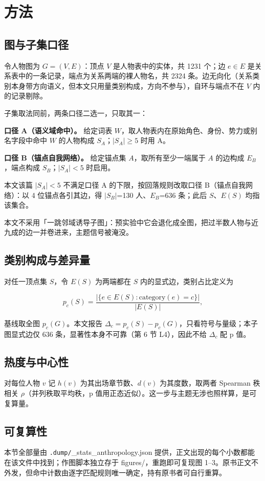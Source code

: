 \section{方法}

\subsection{图与子集口径}

令人物图为 $G=(V,E)$：顶点 $V$ 是人物表中的实体，共 1231 个；边 $e\in E$ 是关系表中的一条记录，端点为关系两端的裸人物名，共 2324 条。边无向化（关系类别本身带方向语义，但本文只用量类别构成，方向不参与），自环与端点不在 $V$ 内的记录剔除。

子集取法同前，两条口径二选一，只取其一：

\textbf{口径 A（语义域命中）。} 给定词表 $W$，取人物表内在原始角色、身份、势力或别名字段中命中 $W$ 的人物构成 $S_A$；$|S_A|\ge 5$ 时用 A。

\textbf{口径 B（锚点自我网络）。} 给定锚点集 $A$，取所有至少一端属于 $A$ 的边构成 $E_B$，端点构成 $S_B$；$|S_A|<5$ 时启用。

本文该篇 $|S_A|<5$ 不满足口径 A 的下限，按回落规则改取口径 B（锚点自我网络）：以 4 位锚点各引其边，得 $|S_B|$=130 人、$E_B$=636 条；此后 $S$、$E(S)$ 均指该集合。

本文不采用「一跳邻域诱导子图」：预实验中它会退化成全图，把过半数人物与近九成的边一并卷进来，主题信号被淹没。

\subsection{类别构成与差异量}

对任一顶点集 $S$，令 $E(S)$ 为两端都在 $S$ 内的显式边，类别占比定义为

\begin{equation}\label{eq:p_cat}
p_c(S) = \frac{|\{e\in E(S): \mathrm{category}(e)=c\}|}{|E(S)|},
\end{equation}

基线取全图 $p_c(G)$。本文报告 $\Delta_c=p_c(S)-p_c(G)$，只看符号与量级；本子图显式边仅 636 条，显著性本身不可靠（第 6 节 L4），因此不给 $\Delta_c$ 配 p 值。

\subsection{热度与中心性}

对每位人物 $v$ 记 $h(v)$ 为其出场章节数、$d(v)$ 为其度数，取两者 Spearman 秩相关 $\rho$（并列秩取平均秩，p 值用正态近似）。这一步与主题无涉也照样算，是可复算量。

\subsection{可复算性}

本节全部量由 \texttt{.dump/}\_stats\_anthropology.json 提供，正文出现的每个小数都能在该文件中找到；作图脚本独立存于 figures/，重跑即可复现图 1--3。原书正文不外发，但命中计数由逐字匹配规则唯一确定，持有原书者可自行重算。
